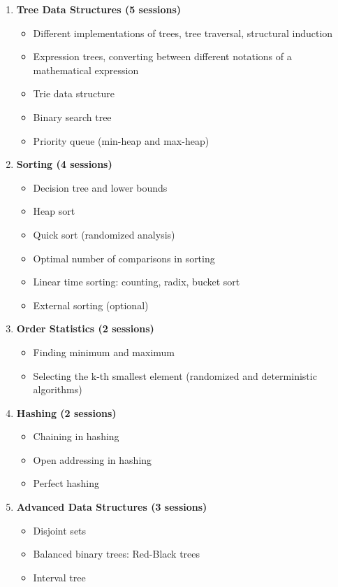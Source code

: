 \documentclass[12pt]{article}
\begin{document}
\begin{enumerate}
    \item \textbf{Tree Data Structures (5 sessions)}
        \begin{itemize}
            \item Different implementations of trees, tree traversal, structural induction
            \item Expression trees, converting between different notations of a mathematical expression
            \item Trie data structure
            \item Binary search tree
            \item Priority queue (min-heap and max-heap)
        \end{itemize}
    
    \item \textbf{Sorting (4 sessions)}
        \begin{itemize}
            \item Decision tree and lower bounds
            \item Heap sort
            \item Quick sort (randomized analysis)
            \item Optimal number of comparisons in sorting
            \item Linear time sorting: counting, radix, bucket sort
            \item External sorting (optional)
        \end{itemize}
    
    \item \textbf{Order Statistics (2 sessions)}
        \begin{itemize}
            \item Finding minimum and maximum
            \item Selecting the k-th smallest element (randomized and deterministic algorithms)
        \end{itemize}
    
    \item \textbf{Hashing (2 sessions)}
        \begin{itemize}
            \item Chaining in hashing
            \item Open addressing in hashing
            \item Perfect hashing
        \end{itemize}
    
    \item \textbf{Advanced Data Structures (3 sessions)}
        \begin{itemize}
            \item Disjoint sets
            \item Balanced binary trees: Red-Black trees
            \item Interval tree
        \end{itemize}
    

\end{enumerate}
\end{document}
